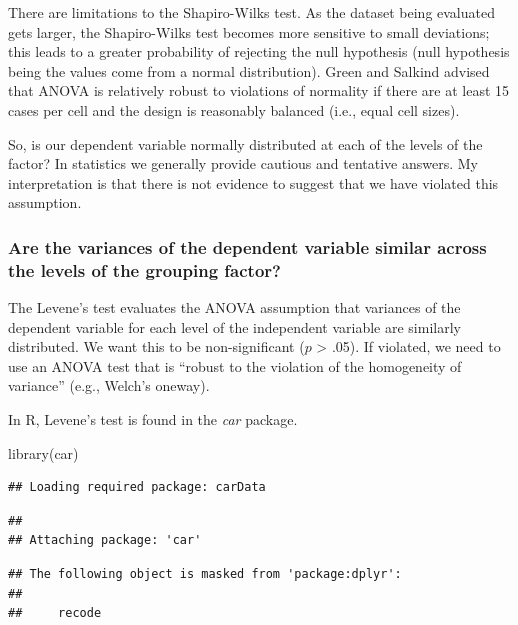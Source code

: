 \documentclass[
  english,
]{book}
\newenvironment{Shaded}{\begin{snugshade}}{\end{snugshade}}
\newcommand{\FunctionTok}[1]{\textcolor[rgb]{0.00,0.00,0.00}{#1}}
\newcommand{\NormalTok}[1]{#1}
\begin{document}
There are limitations to the Shapiro-Wilks test. As the dataset being evaluated gets larger, the Shapiro-Wilks test becomes more sensitive to small deviations; this leads to a greater probability of rejecting the null hypothesis (null hypothesis being the values come from a normal distribution). Green and Salkind \citeyearpar{green_using_2014} advised that ANOVA is relatively robust to violations of normality if there are at least 15 cases per cell and the design is reasonably balanced (i.e., equal cell sizes).

So, is our dependent variable normally distributed at each of the levels of the factor? In statistics we generally provide cautious and tentative answers. My interpretation is that there is not evidence to suggest that we have violated this assumption.

\hypertarget{are-the-variances-of-the-dependent-variable-similar-across-the-levels-of-the-grouping-factor}{%
\subsubsection{Are the variances of the dependent variable similar across the levels of the grouping factor?}\label{are-the-variances-of-the-dependent-variable-similar-across-the-levels-of-the-grouping-factor}}

The Levene's test evaluates the ANOVA assumption that variances of the dependent variable for each level of the independent variable are similarly distributed. We want this to be non-significant (\(p\) \textgreater{} .05). If violated, we need to use an ANOVA test that is ``robust to the violation of the homogeneity of variance'' (e.g., Welch's oneway).

In R, Levene's test is found in the \emph{car} package.

\begin{Shaded}
\begin{Highlighting}[]
\FunctionTok{library}\NormalTok{(car)}
\end{Highlighting}
\end{Shaded}

\begin{verbatim}
## Loading required package: carData
\end{verbatim}

\begin{verbatim}
## 
## Attaching package: 'car'
\end{verbatim}

\begin{verbatim}
## The following object is masked from 'package:dplyr':
## 
##     recode
\end{verbatim}
\end{document}
